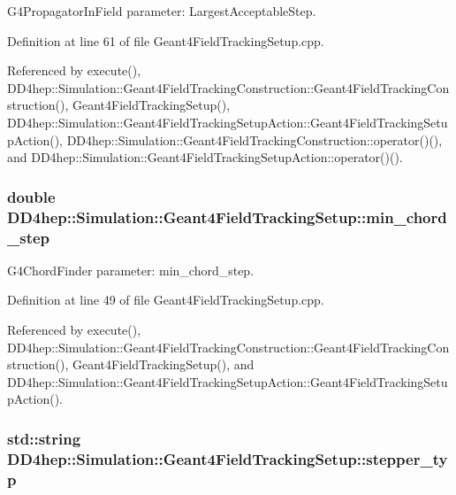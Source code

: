 G4PropagatorInField parameter: LargestAcceptableStep. 

Definition at line 61 of file Geant4FieldTrackingSetup.cpp.

Referenced by execute(), DD4hep::Simulation::Geant4FieldTrackingConstruction::Geant4FieldTrackingConstruction(), Geant4FieldTrackingSetup(), DD4hep::Simulation::Geant4FieldTrackingSetupAction::Geant4FieldTrackingSetupAction(), DD4hep::Simulation::Geant4FieldTrackingConstruction::operator()(), and DD4hep::Simulation::Geant4FieldTrackingSetupAction::operator()().\hypertarget{struct_d_d4hep_1_1_simulation_1_1_geant4_field_tracking_setup_a1ffabcaa88a6f30609794dc2f4c01d22}{
\subsubsection[{min\_\-chord\_\-step}]{\setlength{\rightskip}{0pt plus 5cm}double {\bf DD4hep::Simulation::Geant4FieldTrackingSetup::min\_\-chord\_\-step}}}
\label{struct_d_d4hep_1_1_simulation_1_1_geant4_field_tracking_setup_a1ffabcaa88a6f30609794dc2f4c01d22}


G4ChordFinder parameter: min\_\-chord\_\-step. 

Definition at line 49 of file Geant4FieldTrackingSetup.cpp.

Referenced by execute(), DD4hep::Simulation::Geant4FieldTrackingConstruction::Geant4FieldTrackingConstruction(), Geant4FieldTrackingSetup(), and DD4hep::Simulation::Geant4FieldTrackingSetupAction::Geant4FieldTrackingSetupAction().\hypertarget{struct_d_d4hep_1_1_simulation_1_1_geant4_field_tracking_setup_ab9e3cc336df0378ecdb3706c03347f9c}{
\subsubsection[{stepper\_\-typ}]{\setlength{\rightskip}{0pt plus 5cm}std::string {\bf DD4hep::Simulation::Geant4FieldTrackingSetup::stepper\_\-typ}}}
\label{struct_d_d4hep_1_1_simulation_1_1_geant4_field_tracking_setup_ab9e3cc336df0378ecdb3706c03347f9c}


